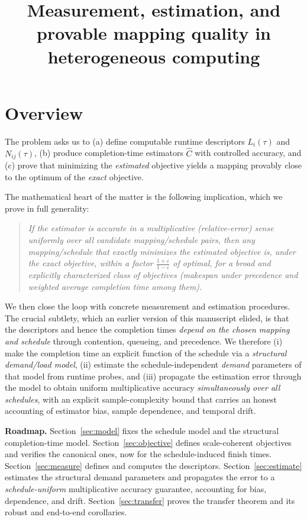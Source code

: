 \documentclass{amsart}
\theoremstyle{definition}
\newcommand{\Chat}{\widehat{C}}
\begin{document}
\title{Measurement, estimation, and provable mapping quality in heterogeneous computing}
\maketitle

\section{Overview}\label{sec:overview}

The problem asks us to (a) define computable runtime descriptors $L_i(\tau)$ and
$N_{ij}(\tau)$, (b) produce completion-time estimators $\Chat$ with controlled
accuracy, and (c) prove that minimizing the \emph{estimated} objective yields a
mapping provably close to the optimum of the \emph{exact} objective.

The mathematical heart of the matter is the following implication, which we
prove in full generality:

\begin{quote}
\emph{If the estimator is accurate in a multiplicative (relative-error) sense
uniformly over all candidate mapping/schedule pairs, then any
mapping/schedule that exactly minimizes the estimated objective is, under the
exact objective, within a factor $\tfrac{1+\varepsilon}{1-\varepsilon}$ of
optimal, for a broad and explicitly characterized class of objectives (makespan
under precedence and weighted average completion time among them).}
\end{quote}

We then close the loop with concrete measurement and estimation procedures.
The crucial subtlety, which an earlier version of this manuscript elided, is
that the descriptors and hence the completion times \emph{depend on the chosen
mapping and schedule} through contention, queueing, and precedence. We
therefore (i) make the completion time an explicit function of the schedule via
a \emph{structural demand/load model}, (ii) estimate the schedule-independent
\emph{demand} parameters of that model from runtime probes, and (iii) propagate
the estimation error through the model to obtain uniform multiplicative accuracy
\emph{simultaneously over all schedules}, with an explicit sample-complexity
bound that carries an honest accounting of estimator bias, sample dependence,
and temporal drift.

\medskip
\noindent\textbf{Roadmap.} Section~\ref{sec:model} fixes the schedule model and
the structural completion-time model. Section~\ref{sec:objective} defines
scale-coherent objectives and verifies the canonical ones, now for the
schedule-induced finish times. Section~\ref{sec:measure} defines and computes
the descriptors. Section~\ref{sec:estimate} estimates the structural demand
parameters and propagates the error to a \emph{schedule-uniform} multiplicative
accuracy guarantee, accounting for bias, dependence, and drift.
Section~\ref{sec:transfer} proves the transfer theorem and its robust and
end-to-end corollaries.
\end{document}
